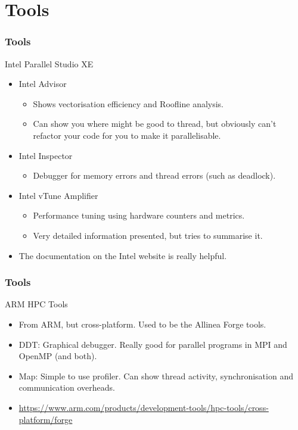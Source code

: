 \documentclass{beamer}
\begin{document}
\section{Tools}
\begin{frame}
\frametitle{Tools}
Intel Parallel Studio XE
\begin{itemize}
  \item Intel Advisor
    \begin{itemize}
      \item Shows vectorisation efficiency and Roofline analysis.
      \item Can show you where might be good to thread, but obviously can't refactor your code for you to make it parallelisable.
    \end{itemize}

  \item Intel Inspector
    \begin{itemize}
      \item Debugger for memory errors and thread errors (such as deadlock).
    \end{itemize}

  \item Intel vTune Amplifier
    \begin{itemize}
      \item Performance tuning using hardware counters and metrics.
      \item Very detailed information presented, but tries to summarise it.
    \end{itemize}

  \item The documentation on the Intel website is really helpful.
\end{itemize}
\end{frame}

\begin{frame}
\frametitle{Tools}
ARM HPC Tools
\begin{itemize}
  \item From ARM, but cross-platform. Used to be the Allinea Forge tools.
  \item DDT: Graphical debugger. Really good for parallel programs in MPI and OpenMP (and both).
  \item Map: Simple to use profiler. Can show thread activity, synchronisation and communication overheads.
  \item \url{https://www.arm.com/products/development-tools/hpc-tools/cross-platform/forge}
\end{itemize}
\end{frame}
\end{document}

